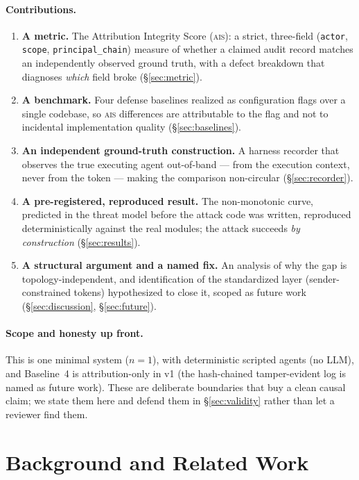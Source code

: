 \documentclass[11pt]{article}
\newcommand{\ais}{\textsc{ais}}
\newcommand{\code}[1]{\texttt{#1}}
\begin{document}
\paragraph{Contributions.}
\begin{enumerate}[leftmargin=1.4em,itemsep=2pt]
  \item \textbf{A metric.} The Attribution Integrity Score (\ais{}): a strict,
  three-field (\code{actor}, \code{scope}, \code{principal\_chain}) measure of
  whether a claimed audit record matches an independently observed ground truth,
  with a defect breakdown that diagnoses \emph{which} field broke (\S\ref{sec:metric}).
  \item \textbf{A benchmark.} Four defense baselines realized as configuration
  flags over a single codebase, so \ais{} differences are attributable to the
  flag and not to incidental implementation quality (\S\ref{sec:baselines}).
  \item \textbf{An independent ground-truth construction.} A harness recorder that
  observes the true executing agent out-of-band --- from the execution context,
  never from the token --- making the comparison non-circular (\S\ref{sec:recorder}).
  \item \textbf{A pre-registered, reproduced result.} The non-monotonic curve,
  predicted in the threat model before the attack code was written, reproduced
  deterministically against the real modules; the attack succeeds \emph{by
  construction} (\S\ref{sec:results}).
  \item \textbf{A structural argument and a named fix.} An analysis of why the gap
  is topology-independent, and identification of the standardized layer
  (sender-constrained tokens) hypothesized to close it, scoped as future work
  (\S\ref{sec:discussion}, \S\ref{sec:future}).
\end{enumerate}

\paragraph{Scope and honesty up front.}
This is one minimal system ($n=1$), with deterministic scripted agents (no LLM),
and Baseline~4 is attribution-only in v1 (the hash-chained tamper-evident log is
named as future work). These are deliberate boundaries that buy a clean causal
claim; we state them here and defend them in \S\ref{sec:validity} rather than
let a reviewer find them.

\section{Background and Related Work}
\label{sec:background}
\end{document}
